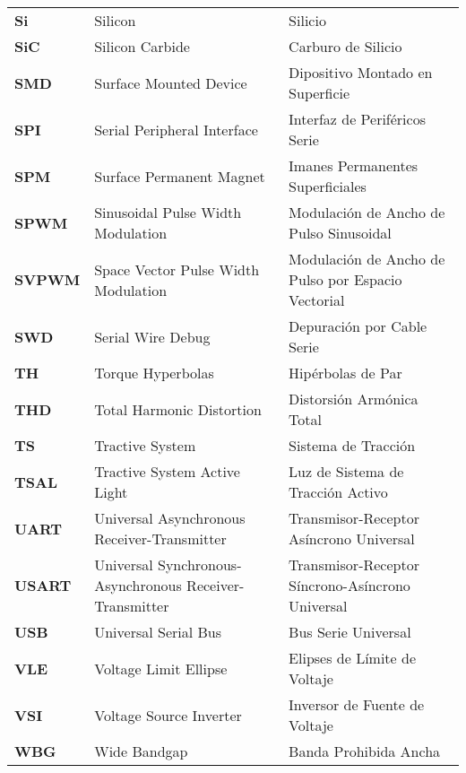 \begin{longtable}{>{\bfseries}p{3cm} p{5cm} p{5cm}}
\textbf{Si} & Silicon & Silicio \\

\textbf{SiC} & Silicon Carbide & Carburo de Silicio \\

\textbf{SMD} & Surface Mounted Device & Dipositivo Montado en Superficie \\

\textbf{SPI} & Serial Peripheral Interface & Interfaz de Periféricos Serie \\

\textbf{SPM} & Surface Permanent Magnet & Imanes Permanentes Superficiales \\

\textbf{SPWM} & Sinusoidal Pulse Width Modulation & Modulación de Ancho de Pulso Sinusoidal \\

\textbf{SVPWM} & Space Vector Pulse Width Modulation & Modulación de Ancho de Pulso por Espacio Vectorial \\

\textbf{SWD} & Serial Wire Debug & Depuración por Cable Serie \\

\textbf{TH} & Torque Hyperbolas & Hipérbolas de Par \\

\textbf{THD} & Total Harmonic Distortion & Distorsión Armónica Total \\

\textbf{TS} & Tractive System & Sistema de Tracción \\

\textbf{TSAL} & Tractive System Active Light & Luz de Sistema de Tracción Activo \\

\textbf{UART} & Universal Asynchronous Receiver-Transmitter & Transmisor-Receptor Asíncrono Universal \\

\textbf{USART} & Universal Synchronous-Asynchronous Receiver-Transmitter & Transmisor-Receptor Síncrono-Asíncrono Universal \\

\textbf{USB} & Universal Serial Bus & Bus Serie Universal \\

\textbf{VLE} & Voltage Limit Ellipse & Elipses de Límite de Voltaje \\

\textbf{VSI} & Voltage Source Inverter & Inversor de Fuente de Voltaje \\

\textbf{WBG} & Wide Bandgap & Banda Prohibida Ancha \\

\end{longtable}

